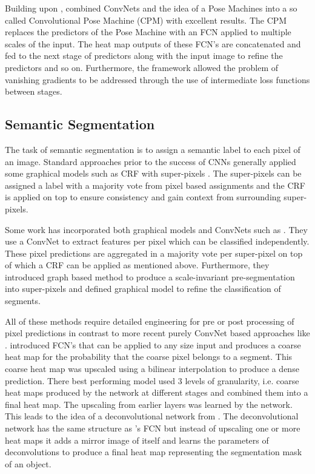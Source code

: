 \documentclass[a4paper,10pt]{article}
\begin{document}
Building upon \cite{Ramakrishna2014}, \cite{Wei2016} combined ConvNets and the idea of a Pose Machines into a so called Convolutional Pose Machine (CPM) with excellent results.  The CPM replaces the predictors of the Pose Machine with an FCN applied to multiple scales of the input.  The heat map outputs of these FCN's are concatenated and fed to the next stage of predictors along with the input image to refine the predictors and so on.  Furthermore, the framework allowed the problem of vanishing gradients \cite{Bengio1994} to be addressed through the use of intermediate loss functions between stages.

\subsection{Semantic Segmentation}
\label{sec:background:segmentation}
The task of semantic segmentation is to assign a semantic label to each pixel of an image.  Standard approaches prior to the success of CNNs generally applied some graphical models such as CRF with super-pixels \cite{Ladick??2009}.  The super-pixels can be assigned a label with a majority vote from pixel based assignments and the CRF is applied on top to ensure consistency and gain context from surrounding super-pixels.  

Some work has incorporated both graphical models and ConvNets such as \cite{Farabet2013}. They use a ConvNet to extract features per pixel which can be classified independently.  These pixel predictions are aggregated in a majority vote per super-pixel on top of which a CRF can be applied as mentioned above.  Furthermore, they introduced graph based method to produce a scale-invariant pre-segmentation into super-pixels and defined graphical model to refine the classification of segments.

All of these methods require detailed engineering for pre or post processing of pixel predictions in contrast to more recent purely ConvNet based approaches like \cite{Long2014,Noh2015}.  \cite{Long2014} introduced FCN's that can be applied to any size input and produces a coarse heat map for the probability that the coarse pixel belongs to a segment.  This coarse heat map was upscaled using a bilinear interpolation to produce a dense prediction.  There best performing model used 3 levels of granularity, i.e. coarse heat maps produced by the network at different stages and combined them into a final heat map.  The upscaling from earlier layers was learned by the network.  This leads to the idea of a deconvolutional network from \cite{Noh2015}.  The deconvolutional network has the same structure as \cite{Long2014}'s FCN but instead of upscaling one or more heat maps it adds a mirror image of itself and learns the parameters of deconvolutions to produce a final heat map representing the segmentation mask of an object.  
\end{document}

